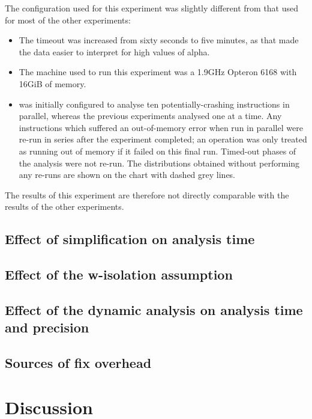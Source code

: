 The configuration used for this experiment was slightly different from
that used for most of the other experiments:
\begin{itemize}
\item The timeout was increased from sixty seconds to five minutes, as
  that made the data easier to interpret for high values of
  \gls{alpha}.
\item The machine used to run this experiment was a 1.9GHz Opteron
  6168 with 16GiB of memory.
\item {\Implementation} was initially configured to analyse ten
  potentially-crashing instructions in parallel, whereas the previous
  experiments analysed one at a time.  Any instructions which suffered
  an out-of-memory error when run in parallel were re-run in series
  after the experiment completed; an operation was only treated as
  running out of memory if it failed on this final run.  Timed-out
  phases of the analysis were not re-run.  The distributions obtained
  without performing any re-runs are shown on the chart with dashed
  grey lines.
\end{itemize}
The results of this experiment are therefore not directly comparable
with the results of the other experiments.

\subsection{Effect of {\StateMachine} simplification on analysis time}


\subsection{Effect of the \gls{w-isolation} assumption}

\subsection{Effect of the dynamic analysis on analysis time and precision}

\subsection{Sources of fix overhead}

\section{Discussion}

